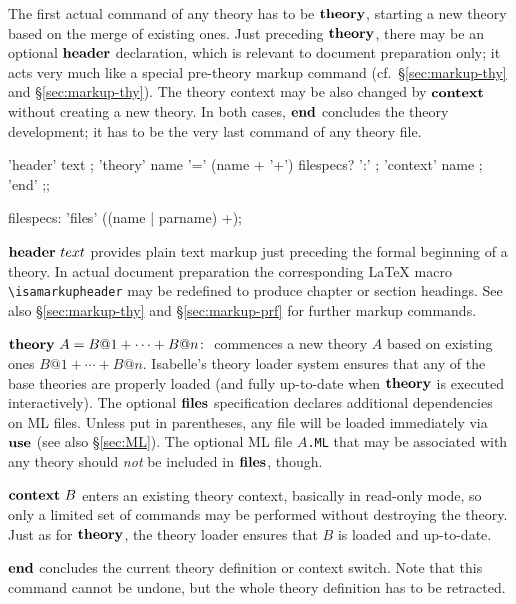 The first actual command of any theory has to be ${\mathord{\mathbf{theory}}}$, starting a new
theory based on the merge of existing ones.  Just preceding ${\mathord{\mathbf{theory}}}$, there
may be an optional ${\mathord{\mathbf{header}}}$ declaration, which is relevant to
document preparation only; it acts very much like a special pre-theory markup
command (cf.\ \S\ref{sec:markup-thy} and \S\ref{sec:markup-thy}).  The theory
context may be also changed by ${\mathord{\mathbf{context}}}$ without creating a new theory.  In
both cases, ${\mathord{\mathbf{end}}}$ concludes the theory development; it has to be the very
last command of any theory file.

\begin{rail}
  'header' text
  ;
  'theory' name '=' (name + '+') filespecs? ':'
  ;
  'context' name
  ;
  'end'
  ;;

  filespecs: 'files' ((name | parname) +);
\end{rail}

\begin{descr}
\item [${\mathord{\mathbf{header}}}~text$] provides plain text markup just preceding
  the formal beginning of a theory.  In actual document preparation the
  corresponding {\LaTeX} macro \verb,\isamarkupheader, may be redefined to
  produce chapter or section headings.  See also \S\ref{sec:markup-thy} and
  \S\ref{sec:markup-prf} for further markup commands.
  
\item [${\mathord{\mathbf{theory}}}~A = B@1 + \cdots + B@n\colon$] commences a new theory $A$
  based on existing ones $B@1 + \cdots + B@n$.  Isabelle's theory loader
  system ensures that any of the base theories are properly loaded (and fully
  up-to-date when ${\mathord{\mathbf{theory}}}$ is executed interactively).  The optional
  ${\mathord{\mathbf{files}}}$ specification declares additional dependencies on ML
  files.  Unless put in parentheses, any file will be loaded immediately via
  ${\mathord{\mathbf{use}}}$ (see also \S\ref{sec:ML}).  The optional ML file
  \texttt{$A$.ML} that may be associated with any theory should \emph{not} be
  included in ${\mathord{\mathbf{files}}}$, though.
  
\item [${\mathord{\mathbf{context}}}~B$] enters an existing theory context, basically in read-only
  mode, so only a limited set of commands may be performed without destroying
  the theory.  Just as for ${\mathord{\mathbf{theory}}}$, the theory loader ensures that $B$ is
  loaded and up-to-date.
  
\item [${\mathord{\mathbf{end}}}$] concludes the current theory definition or context switch.
Note that this command cannot be undone, but the whole theory definition has
to be retracted.
\end{descr}



